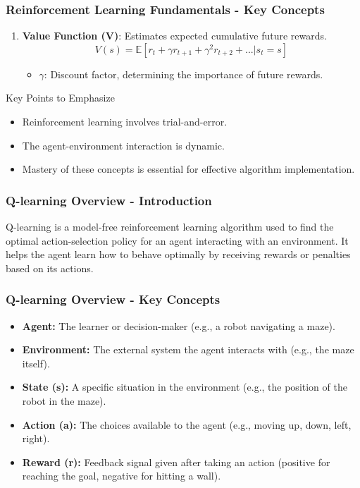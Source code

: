\documentclass{beamer}
\begin{document}
\begin{frame}[fragile]
    \frametitle{Reinforcement Learning Fundamentals - Key Concepts}
    \begin{enumerate}[resume]
        \item \textbf{Value Function (V)}: Estimates expected cumulative future rewards.
        \begin{equation}
            V(s) = \mathbb{E}[r_t + \gamma r_{t+1} + \gamma^2 r_{t+2} + ... | s_t = s]
        \end{equation}
        \begin{itemize}
            \item $\gamma$: Discount factor, determining the importance of future rewards.
        \end{itemize}
    \end{enumerate}

    \begin{block}{Key Points to Emphasize}
        \begin{itemize}
            \item Reinforcement learning involves trial-and-error.
            \item The agent-environment interaction is dynamic.
            \item Mastery of these concepts is essential for effective algorithm implementation.
        \end{itemize}
    \end{block}
\end{frame}

\begin{frame}[fragile]
    \frametitle{Q-learning Overview - Introduction}
    Q-learning is a model-free reinforcement learning algorithm used to find the optimal action-selection policy for an agent interacting with an environment. 
    It helps the agent learn how to behave optimally by receiving rewards or penalties based on its actions.
\end{frame}

\begin{frame}[fragile]
    \frametitle{Q-learning Overview - Key Concepts}
    \begin{itemize}
        \item \textbf{Agent:} The learner or decision-maker (e.g., a robot navigating a maze).
        \item \textbf{Environment:} The external system the agent interacts with (e.g., the maze itself).
        \item \textbf{State (s):} A specific situation in the environment (e.g., the position of the robot in the maze).
        \item \textbf{Action (a):} The choices available to the agent (e.g., moving up, down, left, right).
        \item \textbf{Reward (r):} Feedback signal given after taking an action (positive for reaching the goal, negative for hitting a wall).
    \end{itemize}
\end{frame}
\end{document}
